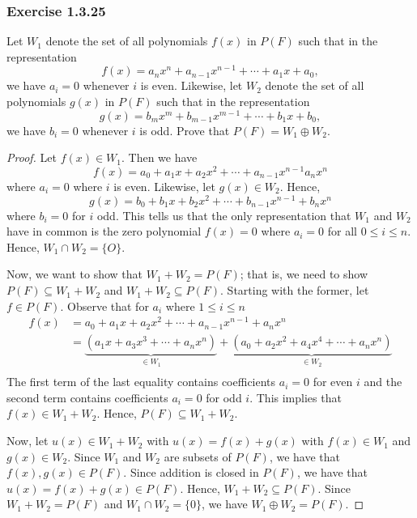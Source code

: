 \subsubsection{Exercise 1.3.25} Let \( W_{1}  \) denote the set of all polynomials \( f(x)  \) in \( P(F)  \) such that in the representation
\[  f(x) = a_{n} x^{n} + a_{n-1} x^{n-1} + \cdots + a_{1} x + a_{0}, \]
we have \( a_{i} = 0  \) whenever \( i  \) is even. Likewise, let \( W_{2}  \) denote the set of all polynomials \( g(x)  \) in \( P(F)  \) such that in the representation 
\[  g(x) = b_{m} x^{m} + b_{m-1} x^{m-1} + \cdots + b_{1} x + b_{0},  \]
we have \( b_{i} = 0  \) whenever \( i  \) is odd. Prove that \( P(F) = W_{1} \oplus W_{2} \).
\begin{proof}
Let \( f(x) \in W_{1}  \).  Then we have
\[ f(x) = a_{0} + a_{1} x + a_{2} x^{2} + \cdots + a_{n-1}x^{n-1} a_{n} x^{n}    \]
where \( a_{i} = 0    \) where \( i  \) is even. Likewise, let \( g(x) \in W_{2}   \). Hence, 
\[  g(x) = b_{0} + b_{1} x + b_{2} x^{2} + \cdots + b_{n-1} x^{n-1} + b_{n} x^{n} \]
where \( b_{i} = 0  \) for \( i  \) odd. This tells us that the only representation that \( W_{1}  \) and \( W_{2}  \) have in common is the zero polynomial \( f(x) = 0  \) where \( a_{i} = 0  \) for all \( 0 \leq i \leq n  \). Hence, \( W_{1} \cap W_{2} = \{ O \}  \). 

Now, we want to show that \( W_{1} + W_{2} = P(F)  \); that is, we need to show \( P(F) \subseteq W_{1} + W_{2}  \) and \( W_{1} + W_{2} \subseteq P(F) \). Starting with the former, let \( f \in P(F)  \). Observe that for \( a_{i}  \) where \(  1 \leq i \leq n  \)   
\begin{align*}
    f(x) &= a_{0} + a_{1} x + a_{2} x^{2} + \cdots + a_{n-1}x^{n-1} + a_{n} x^{n}   \\
         &=  \underbrace{(a_{1}x + a_{3} x^{3} + \cdots + a_{n} x^{n} )}_{\in W_{1}} + \underbrace{(a_{0} + a_{2} x^{2} +  a_{4} x^{4} + \cdots + a_{n} x^{n} )}_{\in W_{2}}  \\
\end{align*}
The first term of the last equality contains coefficients \( a_{i} = 0  \) for even \( i   \) and the second term contains coefficients \( a_{i} = 0  \) for odd \( i  \). This implies that \( f(x) \in W_{1} + W_{2}  \). Hence, \( P(F) \subseteq W_{1} + W_{2}  \).

Now, let \( u(x) \in W_{1} + W_{2}  \) with \( u(x) = f(x) + g(x)   \) with \( f(x) \in W_{1}  \) and \( g(x) \in W_{2}  \). Since \( W_{1}  \) and \( W_{2}  \) are subsets of \( P(F) \), we have that \( f(x) , g(x) \in P(F) \). Since addition is closed in \( P(F)  \), we have 
that \( u(x) =  f(x) + g(x) \in P(F) \). Hence, \( W_{1} + W_{2} \subseteq P(F) \).
Since \( W_{1} + W_{2} = P(F) \)  and \( W_{1} \cap W_{2} = \{ 0 \}  \), we have \( W_{1} \oplus W_{2} = P(F) \).
\end{proof}


